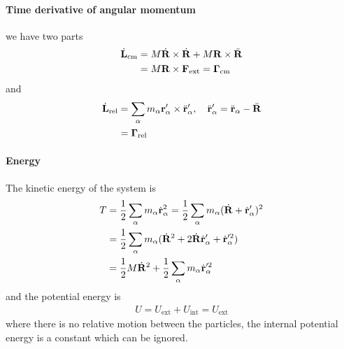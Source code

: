 \documentclass[../main.tex]{subfiles}
\begin{document}
\paragraph*{Time derivative of angular momentum} we have two parts
\begin{align*}
    \dot{\vb L}_{\text{cm}} &= M \dot{\vb R} \times \dot{\vb R} + M \vb R \times \ddot{\vb R} \\
    &= M \vb R \times \vb F_{\text{ext}} = \vb \Gamma_{\text{cm}} 
\end{align*}
and
\begin{align*}
    \dot{\vb L}_{\text{rel}} &= \sum_\alpha m_\alpha \vb r_\alpha' \times \ddot{\vb r}_\alpha', 
    \quad \ddot{\vb r}_\alpha' = \ddot{\vb r}_\alpha - \ddot{\vb R} \\
    &= \vb \Gamma_{\text{rel}}
\end{align*}
\paragraph*{Energy} The kinetic energy of the system is
\begin{align*}
    T &= \frac{1}{2} \sum_\alpha m_\alpha \dot{\vb r}_\alpha^2 = \frac{1}{2} \sum_\alpha m_\alpha(\dot{\vb R} + \dot{\vb r}_\alpha')^2 \\
    &= \frac{1}{2} \sum_\alpha m_\alpha (\dot{\vb R}^2 + 2\dot{\vb R} \dot{\vb r}_\alpha' + \dot{\vb r}_\alpha'^2) \\
    &= \frac{1}{2} M \dot{\vb R}^2 + \frac{1}{2} \sum_\alpha m_\alpha \dot{\vb r}_\alpha'^2
\end{align*}
and the potential energy is
\begin{align*}
    U = U_{\text{ext}} + U_{\text{int}} = U_{\text{ext}}
\end{align*}
where there is no relative motion between the particles, the internal potential energy is a constant
which can be ignored. 
\end{document}
